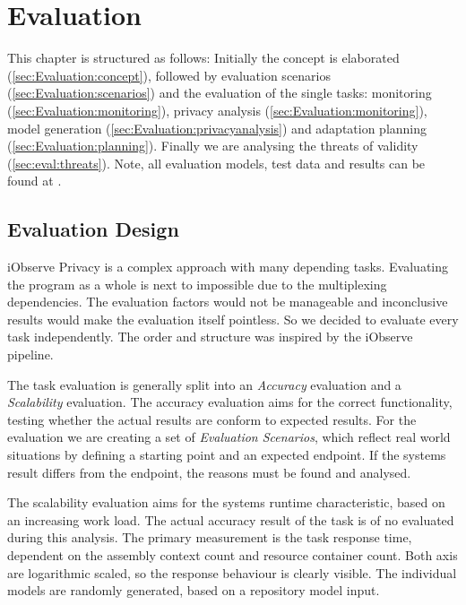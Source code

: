 
\chapter{Evaluation}
\label{ch:Evaluation}

This chapter is structured as follows: Initially the concept is elaborated (\autoref{sec:Evaluation:concept}), followed by evaluation scenarios (\autoref{sec:Evaluation:scenarios}) and the evaluation of the single tasks: monitoring (\autoref{sec:Evaluation:monitoring}), privacy analysis (\autoref{sec:Evaluation:monitoring}), model generation (\autoref{sec:Evaluation:privacyanalysis}) and  adaptation planning (\autoref{sec:Evaluation:planning}). Finally we are analysing the threats of validity (\autoref{sec:eval:threats}). Note, all evaluation models, test data and results can be found at \cite{privacy.PW}.

\section{Evaluation Design}
\label{sec:Evaluation:concept}

iObserve Privacy is a complex approach with many depending tasks. Evaluating the program as a whole is next to impossible due to the multiplexing dependencies. The evaluation factors would not be manageable and inconclusive results would make the evaluation itself pointless. So we decided to evaluate every task independently. The order and structure was inspired by the iObserve pipeline.

The task evaluation is generally split into an \textit{Accuracy} evaluation and a \textit{Scalability} evaluation. The accuracy evaluation aims for the correct functionality, testing whether the actual results are conform to expected results. For the evaluation we are creating a set of \textit{Evaluation Scenarios}, which reflect real world situations by defining a starting point and an expected endpoint. If the systems result differs from the endpoint, the reasons must be found and analysed.

The scalability evaluation aims for the systems runtime characteristic, based on an increasing work load. The actual accuracy result of the task is of no evaluated during this analysis. The primary measurement is the task response time, dependent on the assembly context count and resource container count. Both axis are logarithmic scaled, so the response behaviour is clearly visible. The individual models are randomly generated, based on a repository model input.

